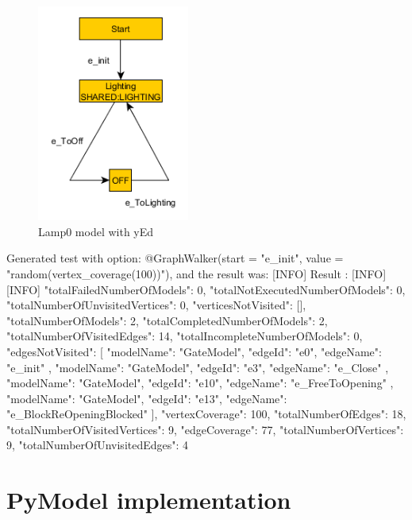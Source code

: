 \begin{figure}[!ht]
	\centering
	\includegraphics[width=50mm, keepaspectratio]{figures/LightingModel.png}
	\caption{Lamp0 model with yEd}
	\label{fig:LampModel}
\end{figure}


Generated test with option: @GraphWalker(start = "e\_init", value = "random(vertex\_coverage(100))"), and the result was:
[INFO] Result :
[INFO] 
[INFO] {
	"totalFailedNumberOfModels": 0,
	"totalNotExecutedNumberOfModels": 0,
	"totalNumberOfUnvisitedVertices": 0,
	"verticesNotVisited": [],
	"totalNumberOfModels": 2,
	"totalCompletedNumberOfModels": 2,
	"totalNumberOfVisitedEdges": 14,
	"totalIncompleteNumberOfModels": 0,
	"edgesNotVisited": [
	{
		"modelName": "GateModel",
		"edgeId": "e0",
		"edgeName": "e\_init"
	},
	{
		"modelName": "GateModel",
		"edgeId": "e3",
		"edgeName": "e\_Close"
	},
	{
		"modelName": "GateModel",
		"edgeId": "e10",
		"edgeName": "e\_FreeToOpening"
	},
	{
		"modelName": "GateModel",
		"edgeId": "e13",
		"edgeName": "e\_BlockReOpeningBlocked"
	}
	],
	"vertexCoverage": 100,
	"totalNumberOfEdges": 18,
	"totalNumberOfVisitedVertices": 9,
	"edgeCoverage": 77,
	"totalNumberOfVertices": 9,
	"totalNumberOfUnvisitedEdges": 4
}

\section{PyModel implementation}